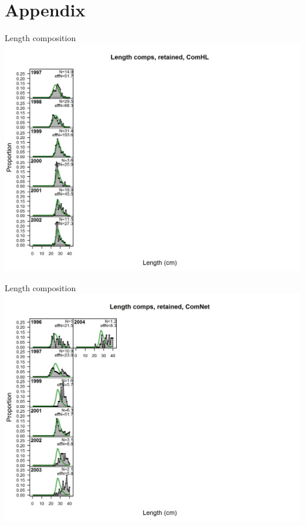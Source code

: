 \documentclass[ignorenonframetext,compress]{beamer}
\begin{document}
\section{Appendix}\label{appendix}

\begin{frame}{Length composition}\includegraphics{./r4ss/plots_mod1/comp_lenfit_flt1mkt2.png}\end{frame}

\begin{frame}{Length composition}\includegraphics{./r4ss/plots_mod1/comp_lenfit_flt2mkt2.png}\end{frame}
\end{document}

